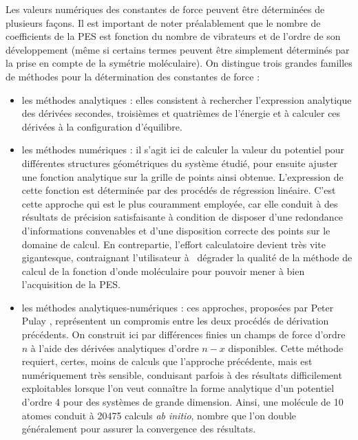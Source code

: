 \documentclass[12pt,a4paper]{book}
\begin{document}
Les valeurs numériques des constantes de force peuvent être déterminées de plusieurs façons. Il est important de noter préalablement que le nombre de coefficients de la PES est fonction du nombre de vibrateurs et de l’ordre de son développement (même si certains termes peuvent être simplement déterminés par la prise en compte de la symétrie moléculaire). On distingue trois grandes familles de méthodes pour la détermination des constantes de force : 
\begin{itemize}
\item les méthodes analytiques : elles consistent à rechercher l’expression analytique des dérivées secondes, troisièmes et quatrièmes de l’énergie et à calculer ces dérivées à la configuration d’équilibre. \\
\item les méthodes numériques : il s’agit ici de calculer la valeur du potentiel pour différentes structures géométriques du système étudié, pour ensuite ajuster une fonction analytique sur la grille de points ainsi obtenue. L’expression de cette fonction est déterminée par des procédés de régression linéaire. C’est cette approche qui est le plus couramment employée, car elle conduit à des résultats de précision satisfaisante à condition de disposer d’une redondance d’informations convenables et d’une disposition correcte des points sur le domaine de calcul. En contrepartie, l’effort calculatoire devient très vite gigantesque, contraignant l’utilisateur à \og dégrader \fg{} la qualité de la méthode de calcul de la fonction d’onde moléculaire pour pouvoir mener à bien l’acquisition de la PES. \\
\item les méthodes analytiques-numériques : ces approches, proposées par Peter Pulay \cite{pulay1969ab}, représentent un compromis entre les deux procédés de dérivation précédents. On construit ici par différences finies un champs de force d’ordre $n$ à l’aide des dérivées analytiques d’ordre $n-x$ disponibles. Cette méthode requiert, certes, moins de calculs que l’approche précédente, mais est numériquement très sensible, conduisant parfois à des résultats difficilement exploitables lorsque l’on veut connaître la forme analytique d’un potentiel d’ordre 4 pour des systèmes de grande dimension. Ainsi, une molécule de 10 atomes conduit à 20475 calculs \textit{ab initio}, nombre que l’on double généralement pour assurer la convergence des résultats. 
\end{itemize}
\end{document}
